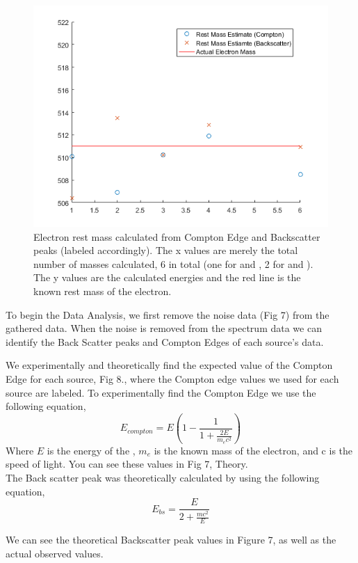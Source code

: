\documentclass[%
 reprint,
 amsmath,amssymb,
 aps,
]{revtex4-1}
\begin{document}
 \begin{figure}[hb]
\includegraphics[width = .5\textwidth ,keepaspectratio,frame]{mass.png}
\caption{  Electron rest mass calculated from Compton Edge and Backscatter peaks (labeled accordingly). The x values are merely the total number of masses calculated, 6 in total (one for \cs and \ba, 2 for \na and \co). The y values are the calculated energies and the red line is the known rest mass of the electron.}
\end{figure}
To begin the Data Analysis, we first remove the noise data (Fig 7) from the gathered data. When the noise is removed from the spectrum data we can identify the Back Scatter peaks and Compton Edges of each source's data. 

We experimentally and theoretically find the expected value of the Compton Edge for each source, Fig 8., where the Compton edge values we used for each source are labeled.  To experimentally find the Compton Edge we use the following equation,
\begin{equation} 
E_{compton} = E \left(1 - \frac{1}{1 + \frac{2E}{m_ec^2}}\right)
\end{equation}
Where $E$ is the energy of the \gp, $m_e$ is the known mass of the electron, and c is the speed of light. You can see these values in Fig 7, Theory.\\

The Back scatter peak was theoretically calculated by using the following equation,
\begin{equation} 
E_{bs} = \frac{E}{2 + \frac{mc^2}{E}}
\end{equation} 

We can see the theoretical Backscatter peak values in Figure 7, as well as the actual observed values.\\
\end{document}
